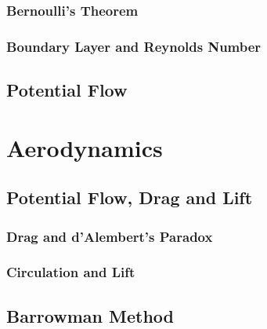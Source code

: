 \documentclass[uplatex,dvipdfmx,a4j,11pt]{report}
\numberwithin{equation}{chapter}
\begin{document}
\subsection{Bernoulli's Theorem}

\subsection{Boundary Layer and Reynolds Number}

\section{Potential Flow}


\chapter{Aerodynamics}

\section{Potential Flow, Drag and Lift}
\subsection{Drag and d'Alembert's Paradox}

\subsection{Circulation and Lift}

\section{Barrowman Method}
\end{document}
